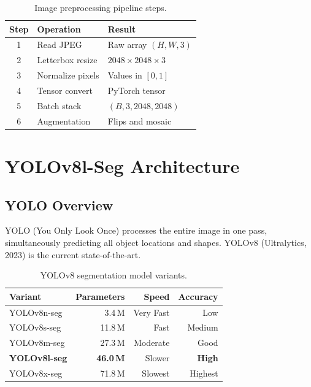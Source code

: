 \documentclass[12pt,a4paper,openany]{report}
\begin{document}
\begin{table}[H]
\centering
\caption{Image preprocessing pipeline steps.}
\renewcommand{\arraystretch}{1.3}
\begin{tabular}{c l l}
\toprule
\textbf{Step} & \textbf{Operation} & \textbf{Result} \\
\midrule
1 & Read JPEG         & Raw array $(H,W,3)$ \\
2 & Letterbox resize  & $2048\times2048\times3$ \\
3 & Normalize pixels  & Values in $[0,1]$ \\
4 & Tensor convert    & PyTorch tensor \\
5 & Batch stack       & $(B,3,2048,2048)$ \\
6 & Augmentation      & Flips and mosaic \\
\bottomrule
\end{tabular}
\label{tab:preproc}
\end{table}

\chapter{YOLOv8l-Seg Architecture}

\section{YOLO Overview}

YOLO (You Only Look Once) processes the entire image in one pass, simultaneously predicting
all object locations and shapes. YOLOv8 (Ultralytics, 2023) is the current state-of-the-art.

\begin{table}[H]
\centering
\caption{YOLOv8 segmentation model variants.}
\renewcommand{\arraystretch}{1.3}
\begin{tabular}{l r r r}
\toprule
\textbf{Variant} & \textbf{Parameters} & \textbf{Speed} & \textbf{Accuracy} \\
\midrule
YOLOv8n-seg &  3.4\,M & Very Fast & Low     \\
YOLOv8s-seg & 11.8\,M & Fast      & Medium  \\
YOLOv8m-seg & 27.3\,M & Moderate  & Good    \\
\textbf{YOLOv8l-seg} & \textbf{46.0\,M} & Slower & \textbf{High} \\
YOLOv8x-seg & 71.8\,M & Slowest   & Highest \\
\bottomrule
\end{tabular}
\label{tab:yolo_variants}
\end{table}
\end{document}
